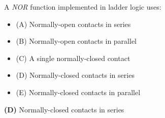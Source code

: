 

A {\it NOR} function implemented in ladder logic uses:

\begin{itemize}
\item{(A)} Normally-open contacts in series
\vskip 5pt 
\item{(B)} Normally-open contacts in parallel
\vskip 5pt 
\item{(C)} A single normally-closed contact
\vskip 5pt 
\item{(D)} Normally-closed contacts in series
\vskip 5pt 
\item{(E)} Normally-closed contacts in parallel
\end{itemize}







{\bf (D)} Normally-closed contacts in series
 










